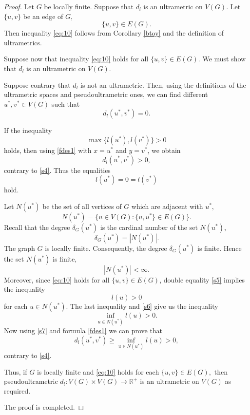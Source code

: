\documentclass[pdflatex,sn-mathphys-num]{sn-jnl}%
\theoremstyle{thmstyleone}%
\theoremstyle{thmstyletwo}%
\theoremstyle{thmstylethree}%
\theoremstyle{thmstyletwo}%
\theoremstyle{thmstylethree}%
\begin{document}
\begin{proof}
 Let $G$ be locally finite.
 Suppose that $d_l$ is an ultrametric on $V(G)$.
Let $\{u,v\}$ be an edge of $G$, 
\begin{equation*}
\{u,v\} \in E(G).
\end{equation*}
Then inequality \eqref{eq:10}  follows from Corollary \ref{btoy} and the definition of ultrametrics.

Suppose now that inequality \eqref{eq:10} holds for all $\{u,v\} \in E(G).$
We must show that $d_l$ is an ultrametric on $V(G).$

Suppose contrary that $d_l$ is not an ultrametric.
Then, using the definitions of the ultrametric spaces and pseudoultrametric ones, we can find different $u^*, v^* \in V(G)$ such that
\begin{equation}
\label{s4}
d_l(u^*,v^*)=0.
\end{equation}


If the inequality
\[
\max\{l(u^*),l(v^*)\}>0
\]
holds, then using \eqref{fdes1} with \( x=u^*\) and \( y=v^* \), we obtain
\[
d_l(u^*,v^*)>0,
\]
contrary to \eqref{s4}. Thus the equalities 
\begin{equation}
    \label{s5}
l(u^*)=0=l(v^*)
\end{equation}
hold.

Let \( N(u^*) \) be the set of all vertices of \( G \) which are adjacent with \( u^* \),
\[
N(u^*)=\{u\in V(G): \{u,u^*\}\in E(G)\}.
\]
Recall that the degree \( \delta_G(u^*) \) is the cardinal number of the set \( N(u^*) \),
\[
\delta_G(u^*)=|N(u^*)|.
\]
The graph \( G \) is locally finite. Consequently, the degree $\delta_G(u^*)$ is finite. Hence the set \( N(u^*) \) is finite,
\begin{equation}
    \label{s6}
|N(u^*)|<\infty.
\end{equation}
Moreover, since \eqref{eq:10} holds for all \( \{u,v\}\in E(G) \), double equality \eqref{s5} implies the inequality 
\[ 
l(u)>0 
\] 
for each \( u\in N(u^*) \).
The last inequality and \eqref{s6} give us the inequality
\begin{equation}
    \label{s7}
\inf_{u\in N(u^*)} l(u) > 0.
\end{equation}
Now using \eqref{s7} and formula \eqref{fdes1} we can prove that
\[
d_l(u^*,v^*) \ge \inf_{u\in N(u^*)} l(u) > 0,
\]
contrary to \eqref{s4}. 

Thus, if $G$ is locally finite and \eqref{eq:10} holds for each $\{u,v\}\in E(G),$ then pseudoultrametric \( d_l: V(G)\times V(G)\to \mathbb{R}^+ \) is an ultrametric on \( V(G) \) as required.

The proof is completed.
\end{proof}
\end{document}
